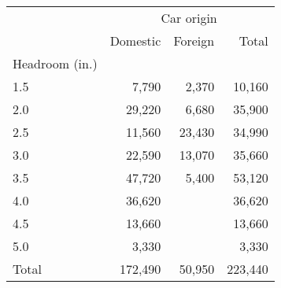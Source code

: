 \documentclass{article}
\begin{document}
\begin{table}[!h]
\centering
\begin{tabular}{llll}
\cline{1-4}
\multicolumn{1}{c}{} &
  \multicolumn{3}{|c}{Car origin} \\
\multicolumn{1}{c}{} &
  \multicolumn{1}{|r}{Domestic} &
  \multicolumn{1}{r}{Foreign} &
  \multicolumn{1}{r}{Total} \\
\cline{1-4}
\multicolumn{1}{l}{Headroom (in.)} &
  \multicolumn{1}{|r}{} &
  \multicolumn{1}{r}{} &
  \multicolumn{1}{r}{} \\
\multicolumn{1}{l}{\hspace{1em}1.5} &
  \multicolumn{1}{|r}{7,790} &
  \multicolumn{1}{r}{2,370} &
  \multicolumn{1}{r}{10,160} \\
\multicolumn{1}{l}{\hspace{1em}2.0} &
  \multicolumn{1}{|r}{29,220} &
  \multicolumn{1}{r}{6,680} &
  \multicolumn{1}{r}{35,900} \\
\multicolumn{1}{l}{\hspace{1em}2.5} &
  \multicolumn{1}{|r}{11,560} &
  \multicolumn{1}{r}{23,430} &
  \multicolumn{1}{r}{34,990} \\
\multicolumn{1}{l}{\hspace{1em}3.0} &
  \multicolumn{1}{|r}{22,590} &
  \multicolumn{1}{r}{13,070} &
  \multicolumn{1}{r}{35,660} \\
\multicolumn{1}{l}{\hspace{1em}3.5} &
  \multicolumn{1}{|r}{47,720} &
  \multicolumn{1}{r}{5,400} &
  \multicolumn{1}{r}{53,120} \\
\multicolumn{1}{l}{\hspace{1em}4.0} &
  \multicolumn{1}{|r}{36,620} &
  \multicolumn{1}{r}{} &
  \multicolumn{1}{r}{36,620} \\
\multicolumn{1}{l}{\hspace{1em}4.5} &
  \multicolumn{1}{|r}{13,660} &
  \multicolumn{1}{r}{} &
  \multicolumn{1}{r}{13,660} \\
\multicolumn{1}{l}{\hspace{1em}5.0} &
  \multicolumn{1}{|r}{3,330} &
  \multicolumn{1}{r}{} &
  \multicolumn{1}{r}{3,330} \\
\multicolumn{1}{l}{\hspace{1em}Total} &
  \multicolumn{1}{|r}{172,490} &
  \multicolumn{1}{r}{50,950} &
  \multicolumn{1}{r}{223,440} \\
\cline{1-4}
\end{tabular}
\end{table}
\end{document}
